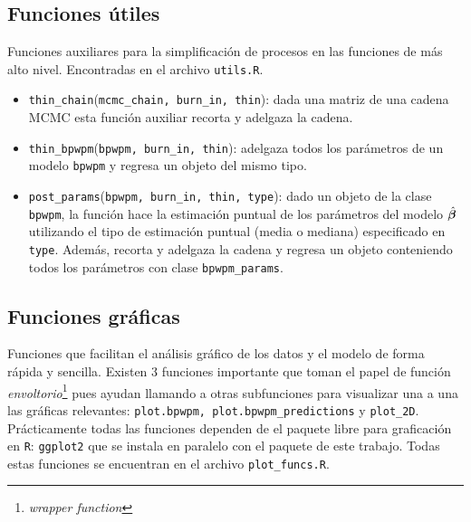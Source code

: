 \documentclass[../../Main/Main.tex]{subfiles}
\begin{document}
\subsection*{Funciones útiles}
Funciones auxiliares para la simplificación de procesos en las funciones de más alto nivel. Encontradas en el archivo \verb|utils.R|.
\begin{itemize}[label={}]
	\item \verb|thin_chain|(\verb|mcmc_chain, burn_in, thin|): dada una matriz de una cadena MCMC esta función auxiliar recorta y adelgaza la cadena.
	\item \verb|thin_bpwpm|(\verb|bpwpm, burn_in, thin|): adelgaza todos los parámetros de un modelo \verb|bpwpm| y regresa un objeto del mismo tipo. 
	\item \verb|post_params|(\verb|bpwpm, burn_in, thin, type|): dado un objeto de la clase \verb|bpwpm|, la función hace la estimación puntual de los parámetros del modelo $\hat{\bm{\beta}}$ utilizando el tipo de estimación puntual (media o mediana) especificado en \verb|type|. Además, recorta y adelgaza la cadena y regresa un objeto conteniendo todos los parámetros con clase \verb|bpwpm_params|.
\end{itemize}

\subsection*{Funciones gráficas}
Funciones que facilitan el análisis gráfico de los datos y el modelo de forma rápida y sencilla. Existen 3 funciones importante que toman el papel de función \textit{envoltorio}\footnote{\emph{wrapper function}} pues ayudan llamando a otras subfunciones para visualizar una a una las gráficas relevantes: \verb|plot.bpwpm, plot.bpwpm_predictions| y \verb|plot_2D|. Prácticamente todas las funciones dependen de el paquete libre para graficación en \verb|R|: \verb|ggplot2| que se instala en paralelo con el paquete de este trabajo. Todas estas funciones se encuentran en el archivo \verb|plot_funcs.R|.
\end{document}
